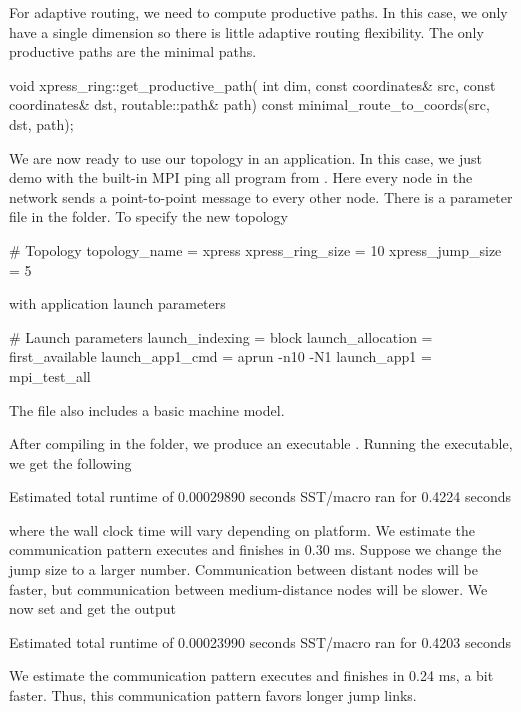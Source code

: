 For adaptive routing, we need to compute productive paths.
In this case, we only have a single dimension so there is little adaptive routing flexibility.
The only productive paths are the minimal paths.

\begin{CppCode}
void
xpress_ring::get_productive_path(
  int dim,
  const coordinates& src,
  const coordinates& dst,
  routable::path& path) const
{
  minimal_route_to_coords(src, dst, path);
}
\end{CppCode}

We are now ready to use our topology in an application.
In this case, we just demo with the built-in MPI ping all program from \sstmacro.
Here every node in the network sends a point-to-point message to every other node.
There is a parameter file in the  folder.
To specify the new topology

\begin{ViFile}
# Topology
topology_name = xpress
xpress_ring_size = 10
xpress_jump_size = 5
\end{ViFile}
with application launch parameters

\begin{ViFile}
# Launch parameters
launch_indexing = block
launch_allocation = first_available
launch_app1_cmd = aprun -n10 -N1
launch_app1 = mpi_test_all
\end{ViFile}
The file also includes a basic machine model.

After compiling in the folder, we produce an executable .
Running the executable, we get the following

\begin{ShellCmd}
Estimated total runtime of           0.00029890 seconds
SST/macro ran for       0.4224 seconds
\end{ShellCmd}
where the \sstmacro wall clock time will vary depending on platform.
We estimate the communication pattern executes and finishes in 0.30 ms.
Suppose we change the jump size to a larger number.
Communication between distant nodes will be faster, but communication between medium-distance nodes will be slower.
We now set  and get the output

\begin{ShellCmd}
Estimated total runtime of           0.00023990 seconds
SST/macro ran for       0.4203 seconds
\end{ShellCmd}
We estimate the communication pattern executes and finishes in 0.24 ms, a bit faster.
Thus, this communication pattern favors longer jump links.



